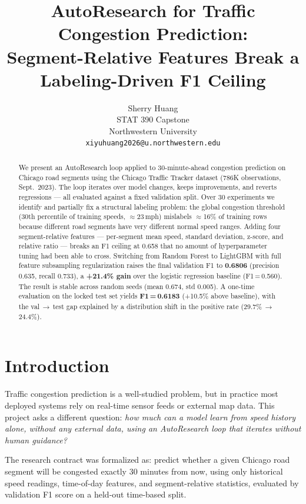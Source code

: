 \documentclass{article}
\title{AutoResearch for Traffic Congestion Prediction:\\
Segment-Relative Features Break a Labeling-Driven F1 Ceiling}
\author{%
  Sherry Huang \\
  STAT 390 Capstone \\
  Northwestern University \\
  \texttt{xiyuhuang2026@u.northwestern.edu}
}
\begin{document}
\maketitle

\begin{abstract}
We present an AutoResearch loop applied to 30-minute-ahead congestion prediction
on Chicago road segments using the Chicago Traffic Tracker dataset (786K observations,
Sept.\ 2023). The loop iterates over model changes, keeps improvements, and reverts
regressions — all evaluated against a fixed validation split. Over 30 experiments we
identify and partially fix a structural labeling problem: the global congestion threshold
(30th percentile of training speeds, $\approx$23\,mph) mislabels $\approx$16\% of
training rows because different road segments have very different normal speed ranges.
Adding four segment-relative features — per-segment mean speed, standard deviation,
z-score, and relative ratio — breaks an F1 ceiling at 0.658 that no amount of
hyperparameter tuning had been able to cross. Switching from Random Forest to LightGBM
with full feature subsampling regularization raises the final validation F1 to
\textbf{0.6806} (precision 0.635, recall 0.733), a \textbf{+21.4\% gain} over the
logistic regression baseline (F1\,=\,0.560). The result is stable across random seeds
(mean 0.674, std 0.005). A one-time evaluation on the locked test set yields
\textbf{F1\,=\,0.6183} (+10.5\% above baseline), with the val\,$\to$\,test gap
explained by a distribution shift in the positive rate (29.7\%\,$\to$\,24.4\%).
\end{abstract}

\section{Introduction}

Traffic congestion prediction is a well-studied problem, but in practice most deployed
systems rely on real-time sensor feeds or external map data. This project asks a
different question: \textit{how much can a model learn from speed history alone, without
any external data, using an AutoResearch loop that iterates without human guidance?}

The research contract was formalized as: predict whether a given Chicago road segment
will be congested exactly 30 minutes from now, using only historical speed readings,
time-of-day features, and segment-relative statistics, evaluated by validation F1 score
on a held-out time-based split.
\end{document}
